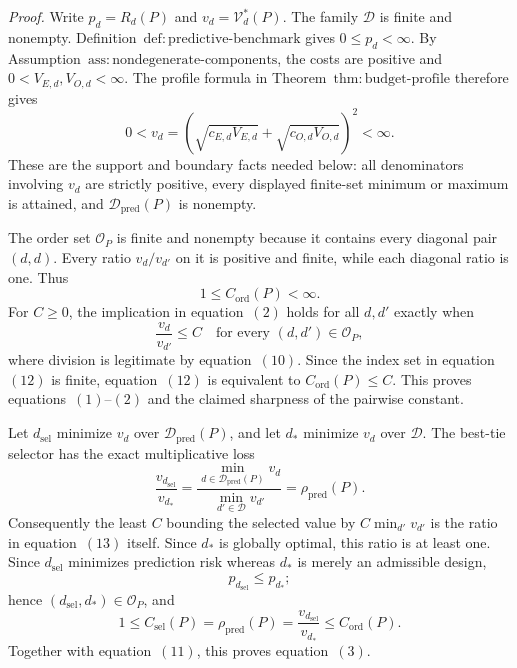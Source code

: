 \emph{Proof.}
Write \(p_d=R_d(P)\) and \(v_d=\mathcal V_d^*(P)\).  The family \(\mathcal D\) is finite and nonempty.  Definition~\(\mathrm{def{:}predictive\text{-}benchmark}\) gives \(0\le p_d<\infty\).  By Assumption~\(\mathrm{ass{:}nondegenerate\text{-}components}\), the costs are positive and \(0<V_{E,d},V_{O,d}<\infty\).  The profile formula in Theorem~\(\mathrm{thm{:}budget\text{-}profile}\) therefore gives
\[
 0<v_d=
 \left(\sqrt{c_{E,d}V_{E,d}}+
       \sqrt{c_{O,d}V_{O,d}}\right)^2<\infty .             \tag{10}
\]
These are the support and boundary facts needed below: all denominators involving \(v_d\) are strictly positive, every displayed finite-set minimum or maximum is attained, and \(\mathcal D_{\mathrm{pred}}(P)\) is nonempty.

The order set \(\mathcal O_P\) is finite and nonempty because it contains every diagonal pair \((d,d)\).  Every ratio \(v_d/v_{d'}\) on it is positive and finite, while each diagonal ratio is one.  Thus
\[
 1\le C_{\mathrm{ord}}(P)<\infty .                         \tag{11}
\]
For \(C\ge0\), the implication in equation~\((2)\) holds for all \(d,d'\) exactly when
\[
 \frac{v_d}{v_{d'}}\le C
 \quad\text{for every }(d,d')\in\mathcal O_P,             \tag{12}
\]
where division is legitimate by equation~\((10)\).  Since the index set in equation~\((12)\) is finite, equation~\((12)\) is equivalent to \(C_{\mathrm{ord}}(P)\le C\).  This proves equations~\((1)\)--\((2)\) and the claimed sharpness of the pairwise constant.

Let \(d_{\mathrm{sel}}\) minimize \(v_d\) over \(\mathcal D_{\mathrm{pred}}(P)\), and let \(d_*\) minimize \(v_d\) over \(\mathcal D\).  The best-tie selector has the exact multiplicative loss
\[
 \frac{v_{d_{\mathrm{sel}}}}{v_{d_*}}
 =\frac{\min_{d\in\mathcal D_{\mathrm{pred}}(P)}v_d}
        {\min_{d'\in\mathcal D}v_{d'}}
 =\rho_{\mathrm{pred}}(P).                                \tag{13}
\]
Consequently the least \(C\) bounding the selected value by \(C\min_{d'}v_{d'}\) is the ratio in equation~\((13)\) itself.  Since \(d_*\) is globally optimal, this ratio is at least one.  Since \(d_{\mathrm{sel}}\) minimizes prediction risk whereas \(d_*\) is merely an admissible design,
\[
 p_{d_{\mathrm{sel}}}\le p_{d_*};
\]
hence \((d_{\mathrm{sel}},d_*)\in\mathcal O_P\), and
\[
 1\le C_{\mathrm{sel}}(P)=\rho_{\mathrm{pred}}(P)
 =\frac{v_{d_{\mathrm{sel}}}}{v_{d_*}}
 \le C_{\mathrm{ord}}(P).                                 \tag{14}
\]
Together with equation~\((11)\), this proves equation~\((3)\).

